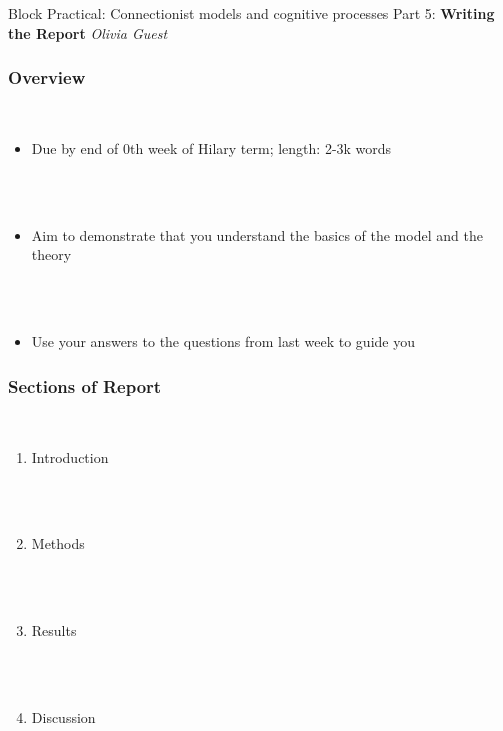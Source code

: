 \documentclass{beamer}
\begin{document}
\begin{frame}[fragile]

\centering\Huge Block Practical: Connectionist models and cognitive processes
\vfill \huge
\centering Part 5: \textbf{Writing the Report} \large
\vfill
\textit{
Olivia Guest }

\end{frame}


\begin{frame}[fragile]
\frametitle{Overview}
        \  \\

\begin{itemize}[<+->]

\item Due by end of 0th week of Hilary term; length: 2-3k words


\ \\

\ \\

 \item Aim to demonstrate that you understand the basics of the model and the theory
 
\ \\

 \ \\
 
\item Use your answers to the questions from last week to guide you


\end{itemize}


\end{frame}


\begin{frame}[fragile]
\frametitle{Sections of Report}

        \  \\

\begin{enumerate}[<+->]
\item Introduction

\ \\

\ \\

\item Methods

\ \\

\ \\

\item Results

\ \\

\ \\

\item Discussion


\end{enumerate}


\end{frame}
\end{document}
